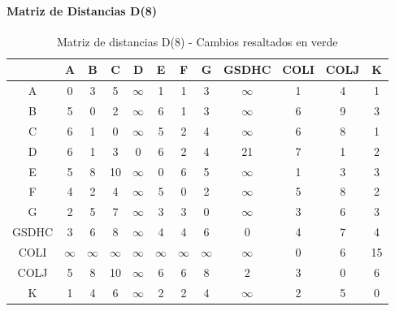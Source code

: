 \documentclass[12pt]{article}
\begin{document}
\paragraph{Matriz de Distancias D(8)}
\begin{table}[h!]
\centering
\begin{tabular}{|c|c|c|c|c|c|c|c|c|c|c|c|}
\hline
 & A & B & C & D & E & F & G & GSDHC & COLI & COLJ & K \\\hline
A & 0 & 3 & 5 & $\infty$ & 1 & 1 & 3 & $\infty$ & 1 & 4 & 1 \\\hline
B & 5 & 0 & 2 & $\infty$ & 6 & 1 & 3 & $\infty$ & 6 & 9 & 3 \\\hline
C & 6 & 1 & 0 & $\infty$ & 5 & 2 & 4 & $\infty$ & 6 & 8 & 1 \\\hline
D & 6 & 1 & 3 & 0 & 6 & 2 & 4 & 21 & 7 & 1 & 2 \\\hline
E & 5 & 8 & 10 & $\infty$ & 0 & 6 & 5 & $\infty$ & 1 & 3 & 3 \\\hline
F & 4 & 2 & 4 & $\infty$ & 5 & 0 & 2 & $\infty$ & 5 & 8 & 2 \\\hline
G & 2 & 5 & 7 & $\infty$ & 3 & 3 & 0 & $\infty$ & 3 & 6 & 3 \\\hline
GSDHC & 3 & 6 & 8 & $\infty$ & 4 & 4 & 6 & 0 & 4 & 7 & 4 \\\hline
COLI & $\infty$ & $\infty$ & $\infty$ & $\infty$ & $\infty$ & $\infty$ & $\infty$ & $\infty$ & 0 & 6 & 15 \\\hline
COLJ & \cellcolor{lightgreen} 5 & \cellcolor{lightgreen} 8 & \cellcolor{lightgreen} 10 & $\infty$ & \cellcolor{lightgreen} 6 & \cellcolor{lightgreen} 6 & \cellcolor{lightgreen} 8 & 2 & 3 & 0 & \cellcolor{lightgreen} 6 \\\hline
K & 1 & 4 & 6 & $\infty$ & 2 & 2 & 4 & $\infty$ & 2 & 5 & 0 \\\hline
\end{tabular}
\caption{Matriz de distancias D(8) - Cambios resaltados en verde}
\end{table}
\end{document}
